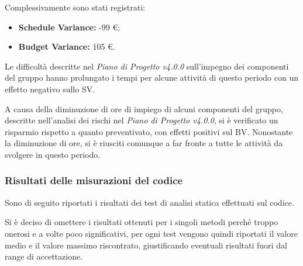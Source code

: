 \noindent Complessivamente sono stati registrati:
\begin{itemize}
	\item \textbf{Schedule Variance:} -99 \euro;
	\item \textbf{Budget Variance:} 105 \euro.
\end{itemize}

\noindent Le difficoltà descritte nel \textit{Piano di Progetto v4.0.0} sull'impegno dei componenti del gruppo hanno prolungato i tempi per alcune attività di questo periodo con un effetto negativo sullo SV.

\noindent A causa della diminuzione di ore di impiego di alcuni componenti del gruppo, descritte nell'analisi dei rischi nel \textit{Piano di Progetto v4.0.0}, si è verificato un risparmio rispetto a quanto preventivato, con effetti positivi sul BV. Nonostante la diminuzione di ore, si è riusciti comunque a far fronte a tutte le attività da svolgere in questo periodo.  

\subsubsection{Risultati delle misurazioni del codice}
\label{appendice 7}
\vspace{3mm}

Sono di seguito riportati i risultati dei test di analisi statica effettuati sul codice.

\noindent Si è deciso di omettere i risultati ottenuti per i singoli metodi perché troppo onerosi e a volte poco significativi, per ogni test vengono quindi riportati il valore medio e il valore massimo riscontrato, giustificando eventuali risultati fuori dal range di accettazione.

